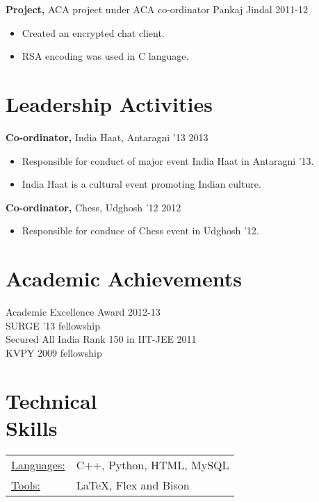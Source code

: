 \documentclass[margin]{res}
\begin{document}
\begin{resume}
 {\bf Project,} ACA project under ACA co-ordinator Pankaj Jindal \hfill 2011-12
 \begin{itemize} \itemsep -2pt  %
 \item Created an encrypted chat client.
 \item RSA encoding was used in C language.
 \end{itemize}

 
 

\section{Leadership Activities} 
               {\bf Co-ordinator,} India Haat, Antaragni '13    \hfill         2013
          \begin{itemize}\itemsep -2pt
          
          
               \item Responsible for conduct of major event India Haat in Antaragni '13.
               \item India Haat is a cultural event promoting Indian culture.
          \end{itemize}

		{\bf Co-ordinator,} Chess, Udghosh '12 \hfill   2012 
                \begin{itemize} \itemsep -2pt
                 \item  Responsible for conduce of Chess event in Udghosh '12.
                
                
		 \end{itemize}

\section{Academic Achievements} 
Academic Excellence Award 2012-13 \\
SURGE '13 fellowship \\
Secured All India Rank 150 in IIT-JEE 2011 \\
KVPY 2009 fellowship
 

\section{Technical \\ Skills}
   \begin{tabular}{l p{3in}}
    \underline{Languages:} & C++, Python, HTML, MySQL \\

     \underline{Tools:} &  \LaTeX, Flex and Bison
 \end{tabular}

\end{resume} 
\end{document}
